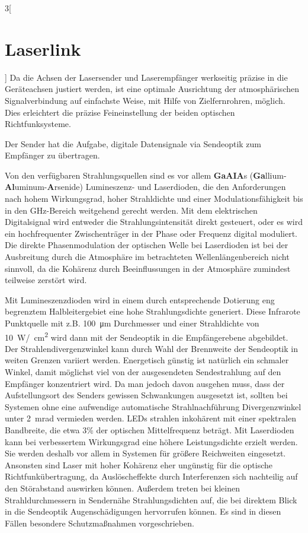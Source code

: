 \begin{multicols}{3}[\section{Laserlink}]
Da die Achsen der Lasersender und Laserempfänger werkseitig präzise in die Geräteachsen justiert werden, ist eine optimale Ausrichtung der atmosphärischen Signalverbindung auf einfachste Weise, mit Hilfe von Zielfernrohren, möglich. Dies erleichtert die präzise Feineinstellung der beiden optischen Richtfunksysteme. 

Der Sender hat die Aufgabe, digitale Datensignale via Sendeoptik zum Empfänger zu übertragen. 

Von den verfügbaren Strahlungsquellen sind es vor allem \textbf{GaAIA}s (\textbf{Ga}llium-\textbf{Al}uminum-\textbf{A}rsenide) Lumineszenz- und Laserdioden, die den Anforderungen nach hohem Wirkungsgrad, hoher Strahldichte und einer Modulationsfähigkeit bis in den GHz-Bereich weitgehend gerecht werden. Mit dem elektrischen Digitalsignal wird entweder die Strahlungsintensität direkt gesteuert, oder es wird ein hochfrequenter Zwischenträger in der Phase oder Frequenz digital moduliert. Die direkte Phasenmodulation der optischen Welle bei Laserdioden ist bei der Ausbreitung durch die Atmosphäre im betrachteten Wellenlängenbereich nicht sinnvoll, da die Kohärenz durch Beeinflussungen in der Atmosphäre zumindest teilweise zerstört wird. 

Mit Lumineszenzdioden wird in einem durch entsprechende Dotierung eng begrenztem Halbleitergebiet eine hohe Strahlungsdichte generiert. Diese Infrarote Punktquelle mit z.B. \SI{100}{\micro\metre} Durchmesser und einer Strahldichte von \SI{10}{\watt/\per\square\centi\metre} wird dann mit der Sendeoptik in die Empfängerebene abgebildet. Der Strahlendivergenzwinkel kann durch Wahl der Brennweite der Sendeoptik in weiten Grenzen variiert werden. Energetisch günstig ist natürlich ein schmaler Winkel, damit möglichst viel von der ausgesendeten Sendestrahlung auf den Empfänger konzentriert wird. Da man jedoch davon ausgehen muss, dass der Aufstellungsort des Senders gewissen Schwankungen ausgesetzt ist, sollten bei Systemen ohne eine aufwendige automatische Strahlnachführung Divergenzwinkel unter \SI{2}{\milli\radian} vermieden werden. LEDs strahlen inkohärent mit einer spektralen Bandbreite, die etwa 3\% der optischen Mittelfrequenz beträgt. 
Mit Laserdioden kann bei verbessertem Wirkungsgrad eine höhere Leistungsdichte erzielt werden. Sie werden deshalb vor allem in Systemen für größere Reichweiten eingesetzt. Ansonsten sind Laser mit hoher Kohärenz eher ungünstig für die optische Richtfunkübertragung, da Auslöscheffekte durch Interferenzen sich nachteilig auf den Störabstand auswirken können. Außerdem treten bei kleinen Strahldurchmessern in Sendernähe Strahlungsdichten auf, die bei direktem Blick in die Sendeoptik Augenschädigungen hervorrufen können. Es sind in diesen Fällen besondere Schutzmaßnahmen vorgeschrieben. 


\end{multicols}

